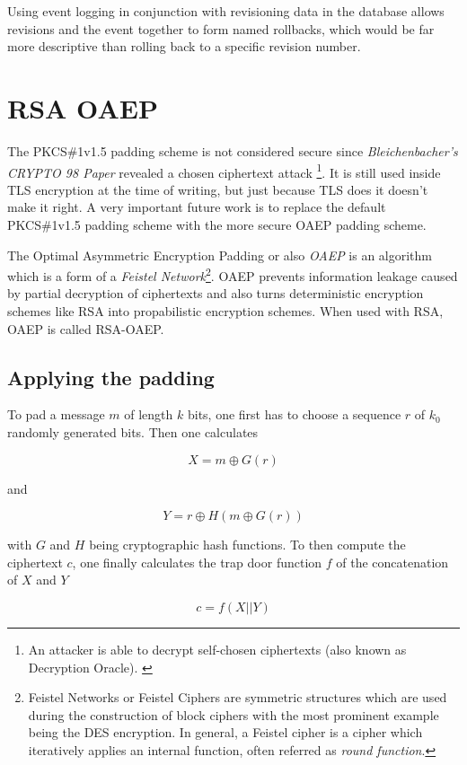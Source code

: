 Using event logging in conjunction with revisioning data in the database allows
revisions and the event together to form named rollbacks, which would be far
more descriptive than rolling back to a specific revision number.

\section{RSA OAEP}

The PKCS\#1v1.5 padding scheme is not considered secure since
\textit{Bleichenbacher's CRYPTO 98 Paper} \cite{rsabulletin}
revealed a chosen ciphertext attack \footnote{
  An attacker is able to decrypt self-chosen ciphertexts (also
  known as Decryption Oracle). \cite[p. 70]{baumann2014kryptographische}
}.
It is still used inside TLS encryption at the time of writing,
but just because TLS does it doesn't make it right. A very important
future work is to replace the default PKCS\#1v1.5 padding scheme with
the more secure OAEP padding scheme.

The Optimal Asymmetric Encryption Padding or also \textit{OAEP}
is an algorithm which is a form of a \textit{Feistel Network}\footnote{
  Feistel Networks or Feistel Ciphers are symmetric structures which are used
  during the construction of block ciphers with the most prominent example
  being the DES encryption. In general, a Feistel cipher is a cipher which
  iteratively applies an internal function, often referred as \textit{round function}.
}. OAEP prevents information leakage caused by partial decryption of 
ciphertexts and also turns deterministic encryption schemes like RSA into
propabilistic encryption schemes. When used with RSA, OAEP is called
RSA-OAEP.

\subsection{Applying the padding}

To pad a message $m$ of length $k$ bits, one first has to choose a sequence
$r$ of $k_0$ randomly generated bits. Then one calculates

$$X = m \oplus G(r)$$

and

$$Y = r \oplus H(m \oplus G(r))$$

with $G$ and $H$ being cryptographic hash functions. To then compute the
ciphertext $c$, one finally calculates the trap door function $f$ of the
concatenation of $X$ and $Y$

$$c = f(X || Y)$$

